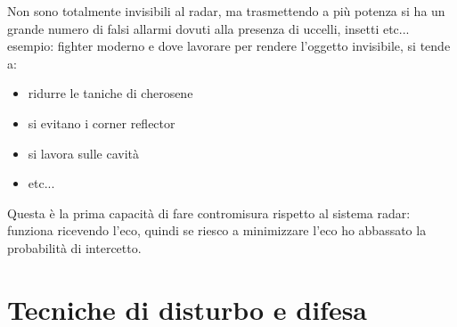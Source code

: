 \documentclass[oneside, 12pt]{extbook}
\begin{document}
Non sono totalmente invisibili al radar, ma trasmettendo a più potenza si ha un grande numero di falsi allarmi dovuti alla presenza di uccelli, insetti etc...\\
esempio: fighter moderno e dove lavorare per rendere l'oggetto invisibile, si tende a:
\begin{itemize}
	\item ridurre le taniche di cherosene
	\item si evitano i corner reflector
	\item si lavora sulle cavità
	\item etc...
\end{itemize}
Questa è la prima capacità di fare contromisura rispetto al sistema radar: funziona ricevendo l'eco, quindi se riesco a minimizzare l'eco ho abbassato la probabilità di intercetto.

\chapter{Tecniche di disturbo e difesa}
\end{document}
